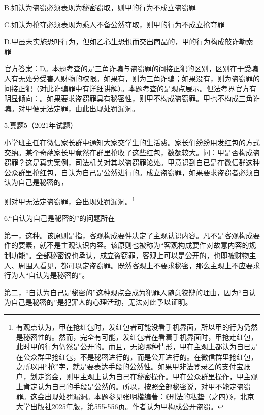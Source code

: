 B.如认为盗窃必须表现为秘密窃取，则甲的行为不成立盗窃罪

C.如认为抢夺必须表现为乘人不备公然夺取，则甲的行为不成立抢夺罪

D.甲虽未实施恐吓行为，但如乙心生恐惧而交出商品的，甲的行为构成敲诈勒索罪

官方答案：D。本题考查的是三角诈骗与盗窃罪的间接正犯的区别，区别在于受骗人有无处分受害人财物的权限。如果有，则为三角诈骗；如果没有，则为盗窃罪的间接正犯（对此诈骗罪中有详细讲解）。本题考查的是观点展示。但法考界官方有明显倾向：。如果要求盗窃罪具有秘密性，则甲不构成盗窃罪。甲也不构成三角诈骗。对甲便无法定罪，由此出现处罚漏洞。

5.真题5（2021年试题）

小学班主任在微信家长群中通知大家交学生的生活费。家长们纷纷用发红包的方式交纳。某个奇葩家长甲竟然在群里抢收了这些红包，数额较大。问：甲是否构成盗窃罪？这是真实案例，司法机关对其以盗窃罪论处。甲意识到自已是在微信群这种公众群里抢红包，自认为自己是公然进行的。成立盗窃罪，如果要求盗窃者必须自认为自己是秘密的，

则对甲无法定盗窃罪，会出现处罚漏洞。\footnote{有观点认为，甲在抢红包时，发红包者可能没看手机界面，所以甲的行为仍然是秘密性的。然而，完全有可能，发红包者在看着手机界面时，甲抢走红包，此时甲的行为仍然是公开的。而且，无论哪种情形，甲在主观上都认为自已是在公众群里抢红包，不是秘密进行的，而是公开进行的。在微信群里抢红包，之所以用“抢”字，就是要表达手段的公然性。如果甲非法登录乙的支付宝账户，划走资金，则甲主观上认为自己在秘密操作。甲在公众群里操作，甲主观上肯定认为自己的手段是公然的。所以，按照全部秘密说，对甲不能定盗窃罪。这会出现处罚漏洞。本题参见张明楷编著：《刑法的私垫（之四）》，北京大学出版社2025年版，第555-556页。作者认为甲构成公开盗窃。}

6.“自认为自己是秘密的”的问题所在

第一，这种。该原则是指，客观构成要件决定了主观认识内容。凡不是客观构成要件的要素，就不是主观认识内容。该原则也被称为“客观构成要件对故意内容的规制功能”。全部秘密说也承认，成立盗窃罪，客观上可以是公开的，也即被财物主人、周围人看见，都可以定盗窃罪。既然客观上不要求秘密，那么主观上不应要求行为人“自认为是秘密的”。

第二，“自认为自己是秘密的”这种观点会成为犯罪人随意狡辩的理由，因为“自认为自己是秘密的”是犯罪人的心理活动，无法对此予以证明。

